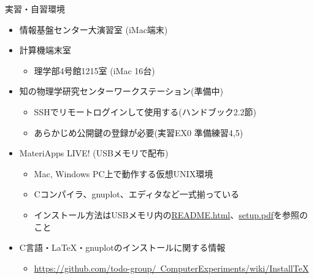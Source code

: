 \begin{frame}[t,fragile]{実習・自習環境}
  \begin{itemize}
  \item 情報基盤センター大演習室 (iMac端末)
  \item 計算機端末室
    \begin{itemize}
    \item 理学部4号館1215室 (iMac 16台)
    \end{itemize}
  \item 知の物理学研究センターワークステーション(準備中)
    \begin{itemize}
    \item SSHでリモートログインして使用する(ハンドブック2.2節)
    \item あらかじめ公開鍵の登録が必要(実習EX0 準備練習4,5)
    \end{itemize}
  \item MateriApps LIVE! (USBメモリで配布)
    \begin{itemize}
    \item Mac, Windows PC上で動作する仮想UNIX環境
    \item Cコンパイラ、gnuplot、エディタなど一式揃っている
    \item インストール方法はUSBメモリ内の\href{https://github.com/cmsi/MateriAppsLive/wiki/MateriAppsLive-ltx}{README.html}、\href{https://github.com/cmsi/MateriAppsLive-setup/blob/master/ova/setup.pdf}{setup.pdf}を参照のこと
    \end{itemize}
  \item C言語・LaTeX・gnuplotのインストールに関する情報
    \begin{itemize}
      \item \href{https://github.com/todo-group/ComputerExperiments/wiki/InstallTeX}{https://github.com/todo-group/\ ComputerExperiments/wiki/InstallTeX}
    \end{itemize}
  \end{itemize}
\end{frame}

